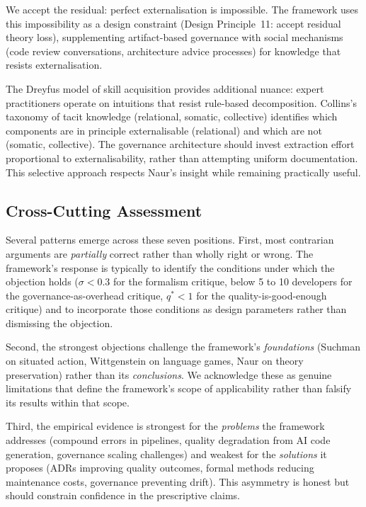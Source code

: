 \documentclass[11pt, a4paper, logo, copyright]{googledeepmind}
\begin{document}
We accept the residual: perfect externalisation is impossible. The framework uses this impossibility as a design constraint (Design Principle~11: accept residual theory loss), supplementing artifact-based governance with social mechanisms (code review conversations, architecture advice processes) for knowledge that resists externalisation.

The Dreyfus model of skill acquisition provides additional nuance: expert
practitioners operate on intuitions that resist rule-based decomposition.
Collins's taxonomy of tacit knowledge (relational, somatic, collective)
identifies which components are in principle externalisable (relational) and
which are not (somatic, collective).  The governance architecture should invest
extraction effort proportional to externalisability, rather than attempting
uniform documentation.  This selective approach respects Naur's insight while
remaining practically useful.


\subsection{Cross-Cutting Assessment}

Several patterns emerge across these seven positions.  First, most contrarian
arguments are \emph{partially} correct rather than wholly right or wrong.  The
framework's response is typically to identify the conditions under which the
objection holds ($\sigma < 0.3$ for the formalism critique, below 5 to 10
developers for the governance-as-overhead critique, $q^* < 1$ for the
quality-is-good-enough critique) and to incorporate those conditions as design
parameters rather than dismissing the objection.

Second, the strongest objections challenge the framework's \emph{foundations}
(Suchman on situated action, Wittgenstein on language games, Naur on
theory preservation) rather than its \emph{conclusions}.  We acknowledge these
as genuine limitations that define the framework's scope of applicability rather
than falsify its results within that scope.

Third, the empirical evidence is strongest for the \emph{problems} the framework
addresses (compound errors in pipelines, quality degradation from AI code
generation, governance scaling challenges) and weakest for the \emph{solutions}
it proposes (ADRs improving quality outcomes, formal methods reducing
maintenance costs, governance preventing drift).  This asymmetry is honest but
should constrain confidence in the prescriptive claims.
\end{document}
